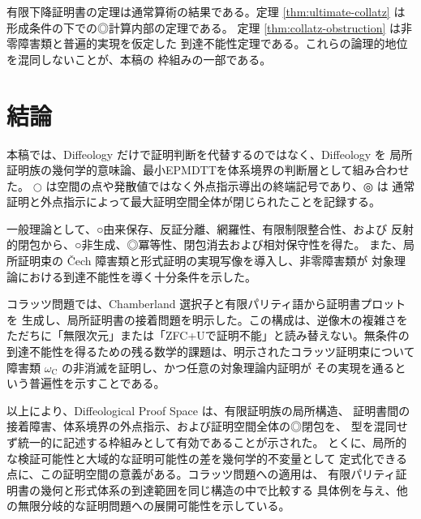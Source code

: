 \documentclass[a4paper,11pt]{ltjsarticle}
\theoremstyle{definition}
\theoremstyle{plain}
\newcommand{\dfix}{\mathord{\text{○}}}
\newcommand{\udfix}{\mathord{\text{◎}}}
\newcommand{\1}{\mathbf{1}}
\begin{document}
有限下降証明書の定理は通常算術の結果である。定理
\ref{thm:ultimate-collatz} は形成条件の下での◎計算内部の定理である。
定理 \ref{thm:collatz-obstruction} は非零障害類と普遍的実現を仮定した
到達不能性定理である。これらの論理的地位を混同しないことが、本稿の
枠組みの一部である。

\section{結論}

本稿では、Diffeology だけで証明判断を代替するのではなく、Diffeology を
局所証明族の幾何学的意味論、最小EPMDTTを体系境界の判断層として組み合わせた。
$\dfix$ は空間の点や発散値ではなく外点指示導出の終端記号であり、$\udfix$ は
通常証明と外点指示によって最大証明空間全体が閉じられたことを記録する。

一般理論として、○由来保存、反証分離、網羅性、有限制限整合性、および
反射的閉包から、○非生成、◎冪等性、閉包消去および相対保守性を得た。
また、局所証明束の Čech 障害類と形式証明の実現写像を導入し、非零障害類が
対象理論における到達不能性を導く十分条件を示した。

コラッツ問題では、Chamberland 選択子と有限パリティ語から証明書プロットを
生成し、局所証明書の接着問題を明示した。この構成は、逆像木の複雑さを
ただちに「無限次元」または「ZFC+Uで証明不能」と読み替えない。無条件の
到達不能性を得るための残る数学的課題は、明示されたコラッツ証明束について
障害類 $\omega_{\mathrm C}$ の非消滅を証明し、かつ任意の対象理論内証明が
その実現を通るという普遍性を示すことである。

以上により、Diffeological Proof Space は、有限証明族の局所構造、
証明書間の接着障害、体系境界の外点指示、および証明空間全体の◎閉包を、
型を混同せず統一的に記述する枠組みとして有効であることが示された。
とくに、局所的な検証可能性と大域的な証明可能性の差を幾何学的不変量として
定式化できる点に、この証明空間の意義がある。コラッツ問題への適用は、
有限パリティ証明書の幾何と形式体系の到達範囲を同じ構造の中で比較する
具体例を与え、他の無限分岐的な証明問題への展開可能性を示している。
\end{document}
